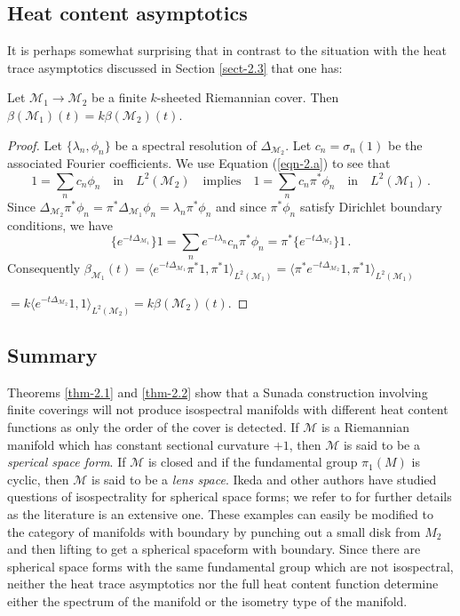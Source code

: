 \documentclass{amsart}
\begin{document}
\subsection{Heat content asymptotics}
It is perhaps somewhat surprising that in contrast to the situation with the heat trace asymptotics discussed
in Section \ref{sect-2.3} that one has:
\begin{theorem}\label{thm-2.2}
 Let $\mathcal{M}_1\rightarrow\mathcal{M}_2$ be a finite $k$-sheeted Riemannian
cover. Then
$\beta(\mathcal{M}_1)(t)=k\beta(\mathcal{M}_2)(t)$.
\end{theorem}

\begin{proof} 
Let
$\{\lambda_n,\phi_n\}$ be a spectral resolution of
$\Delta_{\mathcal{M}_2}$. Let $c_n=\sigma_n(1)$ be the associated Fourier coefficients. We use
Equation (\ref{eqn-2.a}) to see that
$$1=\sum_nc_n\phi_n\quad\text{in}\quad
L^2(\mathcal{M}_2)\quad\text{implies}\quad1=\sum_nc_n\pi^*\phi_n\quad\text{in}\quad
L^2(\mathcal{M}_1)\,.$$
Since
$\Delta_{\mathcal{M}_2}\pi^*\phi_n=\pi^*\Delta_{\mathcal{M}_1}\phi_n=\lambda_n\pi^*\phi_n$ and since
$\pi^*\phi_n$ satisfy Dirichlet boundary conditions, we
have
$$\{e^{-t\Delta_{\mathcal{M}_1}}\}1=\sum_ne^{-t\lambda_n}c_n\pi^*\phi_n=\pi^*\{e^{-t\Delta_{\mathcal{M}_2}}\}1\,.$$
Consequently
\medbreak\qquad
$\beta_{\mathcal{M}_1}(t)=\displaystyle\langle
e^{-t\Delta_{\mathcal{M}_1}}\pi^*1,\pi^*1\rangle_{L^2(\mathcal{M}_1)} =\langle
\pi^*e^{-t\Delta_{\mathcal{M}_2}}1,\pi^*1\rangle_{L^2(\mathcal{M}_1)}$\par\medbreak\qquad\qquad
\phantom{...}
$=k\langle e^{-t\Delta_{\mathcal{M}_2}}1,1\rangle_{L^2(\mathcal{M}_2)}=k\beta(\mathcal{M}_2)(t)$.\hfill
\end{proof}

\subsection{Summary} Theorems \ref{thm-2.1} and \ref{thm-2.2} show that a Sunada construction involving finite
coverings will not produce isospectral manifolds with different heat content functions as only the order of
the cover is detected. If $\mathcal{M}$ is a Riemannian manifold which has constant sectional curvature $+1$,
then
$\mathcal{M}$ is said to be a {\it sperical space form}. If $\mathcal{M}$ is closed and if the fundamental
group $\pi_1(M)$ is cyclic, then
$\mathcal{M}$ is said to be a {\it lens space}. Ikeda \cite{Ik80,Ik83} and other authors have studied
questions of isospectrality for spherical space forms; we refer to \cite{G95, G04} for further details as the
literature is an extensive one. These examples can easily be modified to the category of manifolds with
boundary by punching out a small disk from
$M_2$ and then lifting to get a spherical spaceform with boundary. Since there are spherical space forms with
the same fundamental group which are not isospectral, neither the heat trace asymptotics nor the full heat
content function determine either the spectrum of the manifold or the isometry type of the manifold.
\end{document}
